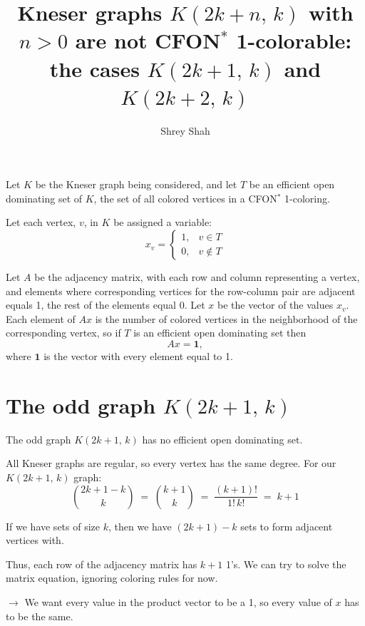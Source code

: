 \documentclass[11pt]{article}
\title{Kneser graphs $K(2k+n,\,k)$ with $n>0$ are not CFON$^{*}$ 1-colorable:\\[2pt]
       the cases $K(2k+1,\,k)$ and $K(2k+2,\,k)$}
\author{Shrey Shah}
\date{}
\begin{document}
\maketitle

Let $K$ be the Kneser graph being considered, and let $T$ be an efficient open
dominating set of $K$, the set of all colored vertices in a CFON$^{*}$
1-coloring.

Let each vertex, $v$, in $K$ be assigned a variable:
\[
  x_v =
  \begin{cases}
    1, & v \in T\\
    0, & v \notin T
  \end{cases}
\]

Let $A$ be the adjacency matrix, with each row and column representing a
vertex, and elements where corresponding vertices for the row-column pair are
adjacent equals 1, the rest of the elements equal 0. Let $x$ be the vector of
the values $x_v$. Each element of $Ax$ is the number of colored vertices in
the neighborhood of the corresponding vertex, so if $T$ is an efficient open
dominating set then
\[
  Ax = \mathbf{1},
\]
where $\mathbf{1}$ is the vector with every element equal to 1.

\section{The odd graph $K(2k+1,\,k)$}

The odd graph $K(2k+1,\,k)$ has no efficient open dominating set.

All Kneser graphs are regular, so every vertex has the same degree. For our
$K(2k+1,\,k)$ graph:
\[
  \binom{2k+1-k}{k} \;=\; \binom{k+1}{k} \;=\; \frac{(k+1)!}{1!\,k!} \;=\; k+1
\]

If we have sets of size $k$, then we have $(2k+1)-k$ sets to form adjacent
vertices with.

Thus, each row of the adjacency matrix has $k+1$ 1's. We can try to solve the
matrix equation, ignoring coloring rules for now.

$\rightarrow$ We want every value in the product vector to be a 1, so every
value of $x$ has to be the same.
\end{document}
